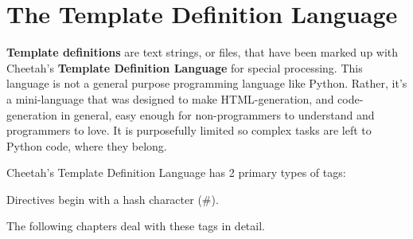 \section{The Template Definition Language}



{\bf Template definitions} are text strings, or files, that have been marked up
with Cheetah's {\bf Template Definition Language} for special processing.  This
language is not a general purpose programming language like Python.  Rather,
it's a mini-language that was designed to make HTML-generation, and
code-generation in general, easy enough for non-programmers to understand and
programmers to love.  It is purposefully limited so complex tasks are left to
Python code, where they belong.

Cheetah's Template Definition Language has 2 primary types of tags:


     Directives begin with a hash character (\#).

The following chapters deal with these tags in detail.

